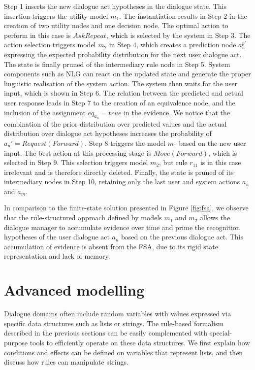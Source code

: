 Step 1 inserts the new dialogue act hypotheses in the dialogue state.  This insertion triggers 
the utility model $m_1$. The instantiation results in Step 2 in the creation of two utility nodes and one decision node.  The optimal action to perform in this case is $\mathit{AskRepeat}$, which is selected by the system in Step 3. The action selection triggers model $m_2$ in Step 4, which creates a prediction node $a_{u}^{p\prime}$ expressing the expected probability distribution for the next user dialogue act. The state is finally pruned of the intermediary rule node in Step 5.  System components such as NLG can react on the updated state and generate the proper linguistic realisation of the system action. The system then waits for the user input, which is shown in Step 6.  The relation between the predicted and actual user response leads in Step 7 to the creation of an equivalence node, and the inclusion of the assignment $\mathit{eq}_{a_u} = true$ in the evidence. We notice that the combination of the prior distribution over predicted values and the actual distribution over dialogue act hypotheses increases the probability of $a_u' = \mathit{Request(Forward)}$. Step 8 triggers the model $m_1$ based on the new user input.  The best action at this processing stage is $\mathit{Move(Forward)}$, which is selected in Step 9.  This selection triggers model $m_2$, but rule $r_{11}$ is in this case irrelevant and is therefore directly deleted. Finally, the state is pruned of its intermediary nodes in Step 10, retaining only the last user and system actions $a_u$ and $a_m$. 

In comparison to the finite-state solution presented in Figure \ref{fig:fsa}, we observe that the rule-structured approach defined by models $m_1$ and $m_2$ allows the dialogue manager to accumulate evidence over time and prime the recognition hypotheses of the user dialogue act $a_u$ based on the previous dialogue act.  This accumulation of evidence is absent from the FSA, due to its rigid state representation and lack of memory. 

\section{Advanced modelling}
\label{sec:amodelling}

Dialogue domains often include random variables with values expressed via specific data structures such as lists or strings. The rule-based formalism described in the previous sections can be easily complemented with special-purpose tools to efficiently operate on these data structures. We first explain how conditions and effects can be defined on variables that represent lists, and then discuss how rules can manipulate strings. 

